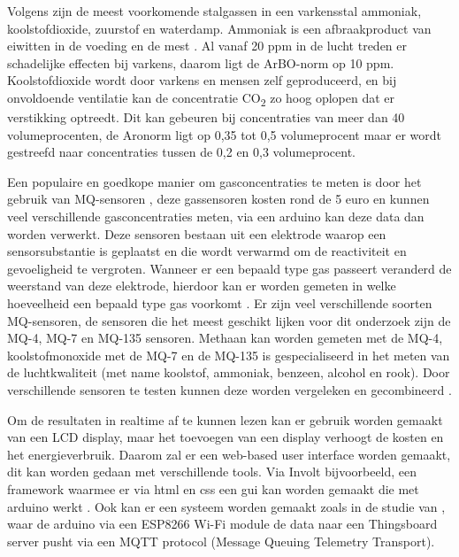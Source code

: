 Volgens \textcite{Klooster1993} zijn de meest voorkomende stalgassen in een varkensstal ammoniak, koolstofdioxide, zuurstof en waterdamp. Ammoniak is een afbraakproduct van eiwitten in de voeding en de mest \autocite{Wolf2013}. Al vanaf 20 ppm in de lucht treden er schadelijke effecten bij varkens, daarom ligt de ArBO-norm op 10 ppm. Koolstofdioxide wordt door varkens en mensen zelf geproduceerd, en bij onvoldoende ventilatie kan de concentratie CO\textsubscript{2} zo hoog oplopen dat er verstikking optreedt. Dit kan gebeuren bij concentraties van meer dan 40 volumeprocenten, de Aronorm ligt op 0,35 tot 0,5 volumeprocent maar er wordt gestreefd naar concentraties tussen de 0,2 en 0,3 volumeprocent.

Een populaire en goedkope manier om gasconcentraties te meten is door het gebruik van MQ-sensoren \autocite{Khadim2021}, deze gassensoren kosten rond de 5 euro en kunnen veel verschillende gasconcentraties meten, via een arduino kan deze data dan worden verwerkt. Deze sensoren bestaan uit een elektrode waarop een sensorsubstantie is geplaatst en die wordt verwarmd om de reactiviteit en gevoeligheid te vergroten. Wanneer er een bepaald type gas passeert veranderd de weerstand van deze elektrode, hierdoor kan er worden gemeten in welke hoeveelheid een bepaald type gas voorkomt \autocite{RC2022}. Er zijn veel verschillende soorten MQ-sensoren, de sensoren die het meest geschikt lijken voor dit onderzoek zijn de MQ-4, MQ-7 en MQ-135 sensoren. Methaan kan worden gemeten met de MQ-4, koolstofmonoxide met de MQ-7 en de MQ-135 is gespecialiseerd in het meten van de luchtkwaliteit (met name koolstof, ammoniak, benzeen, alcohol en rook). Door verschillende sensoren te testen kunnen deze worden vergeleken en gecombineerd \autocite{Soloupis2022}.


Om de resultaten in realtime af te kunnen lezen kan er gebruik worden gemaakt van een LCD display, maar het toevoegen van een display verhoogt de kosten en het energieverbruik. Daarom zal er een web-based user interface worden gemaakt, dit kan worden gedaan met verschillende tools. Via Involt bijvoorbeeld, een framework waarmee er via html en css een gui kan worden gemaakt die met arduino werkt \autocite{Involt}. Ook kan er een systeem worden gemaakt zoals in de studie van \textcite{Rani2020}, waar de arduino via een ESP8266 Wi-Fi module de data naar een Thingsboard server pusht via een MQTT protocol (Message Queuing Telemetry Transport).


